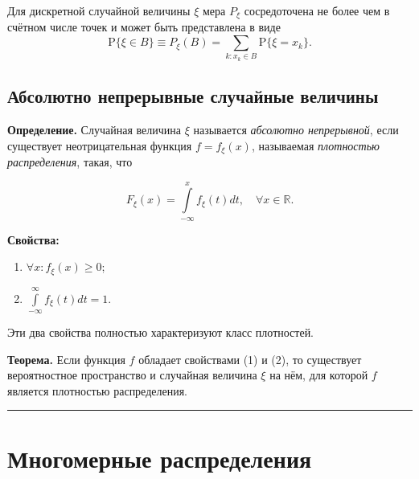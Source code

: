 \documentclass[11pt,a4paper]{article}
\providecommand{\tightlist}{%
      \setlength{\itemsep}{0pt}\setlength{\parskip}{0pt}}
\begin{document}
Для дискретной случайной величины \(\xi\) мера \(P_\xi\) сосредоточена
не более чем в счётном числе точек и может быть представлена в виде \[
  \mathrm{P}\{\xi \in B\} \equiv P_\xi(B) = \sum\limits_{k:x_k \in B} \mathrm{P}\{\xi=x_k\}.
\]

    \hypertarget{ux430ux431ux441ux43eux43bux44eux442ux43dux43e-ux43dux435ux43fux440ux435ux440ux44bux432ux43dux44bux435-ux441ux43bux443ux447ux430ux439ux43dux44bux435-ux432ux435ux43bux438ux447ux438ux43dux44b}{%
\subsection{Абсолютно непрерывные случайные
величины}\label{ux430ux431ux441ux43eux43bux44eux442ux43dux43e-ux43dux435ux43fux440ux435ux440ux44bux432ux43dux44bux435-ux441ux43bux443ux447ux430ux439ux43dux44bux435-ux432ux435ux43bux438ux447ux438ux43dux44b}}

\textbf{Определение.} Случайная величина \(\xi\) называется
\emph{абсолютно непрерывной}, если существует неотрицательная функция
\(f = f_\xi(x)\), называемая \emph{плотностью распределения}, такая, что

\[ F_\xi(x) = \int\limits_{-\infty}^x f_\xi(t) dt, \quad \forall x \in \mathbb{R}. \]

\textbf{Свойства:}

\begin{enumerate}
\def\labelenumi{\arabic{enumi}.}
\tightlist
\item
  \(\forall x: f_\xi (x) \ge 0\);
\item
  \(\int\limits_{-\infty}^{\infty} f_\xi(t) dt = 1\).
\end{enumerate}

Эти два свойства полностью характеризуют класс плотностей.

\textbf{Теорема.} Если функция \(f\) обладает свойствами (1) и (2), то
существует вероятностное пространство и случайная величина \(\xi\) на
нём, для которой \(f\) является плотностью распределения.

    \begin{center}\rule{0.5\linewidth}{0.5pt}\end{center}

    \hypertarget{ux43cux43dux43eux433ux43eux43cux435ux440ux43dux44bux435-ux440ux430ux441ux43fux440ux435ux434ux435ux43bux435ux43dux438ux44f}{%
\section{Многомерные
распределения}\label{ux43cux43dux43eux433ux43eux43cux435ux440ux43dux44bux435-ux440ux430ux441ux43fux440ux435ux434ux435ux43bux435ux43dux438ux44f}}
\end{document}
